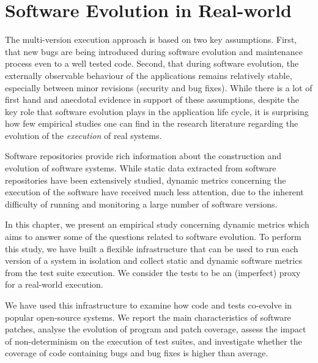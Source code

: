 \chapter{Software Evolution in Real-world}
\label{chap:evolution}

The multi-version execution approach is based on two key assumptions.  First,
that new bugs are being introduced during software evolution and maintenance
process even to a well tested code. Second, that during software evolution,
the externally observable behaviour of the applications remains relatively
stable, especially between minor revisions (\ie security and bug fixes).  While
there is a lot of first hand and anecdotal evidence in support of these
assumptions, despite the key role that software evolution plays in the
application life cycle, it is surprising how few empirical studies one can find
in the research literature regarding the evolution of the \emph{execution} of
real systems.

Software repositories provide rich information about the construction and
evolution of software systems. While static data extracted from software
repositories have been extensively studied, dynamic metrics concerning the
execution of the software have received much less attention, due to the
inherent difficulty of running and monitoring a large number of software
versions.

In this chapter, we present an empirical study concerning dynamic metrics which
aims to answer some of the questions related to software evolution. To perform
this study, we have built a flexible infrastructure that can be used to run
each version of a system in isolation and collect static and dynamic software
metrics from the test suite execution. We consider the tests to be an
(imperfect) proxy for a real-world execution.


We have used this infrastructure to examine how code and tests co-evolve in
\numSystems popular open-source systems. We report the main characteristics of
software patches, analyse the evolution of program and patch coverage, assess
the impact of non-determinism on the execution of test suites, and investigate
whether the coverage of code containing bugs and bug fixes is higher than
average.


